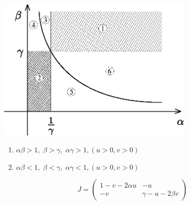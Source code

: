 \begin{center}
\includegraphics[width = 0.7\textwidth]{ch6/system.eps}
\end{center}
\begin{enumerate}
\item $\alpha \beta > 1, \; \beta > \gamma, \; \alpha \gamma > 1, (u > 0, v > 0)$
\item $\alpha \beta < 1, \; \beta < \gamma, \; \alpha \gamma < 1, (u > 0, v > 0)$
\end{enumerate}
$$J = \begin{pmatrix}
1 - v - 2 \alpha u & -u\\
-v & \gamma - u - 2\beta v
\end{pmatrix}
$$

